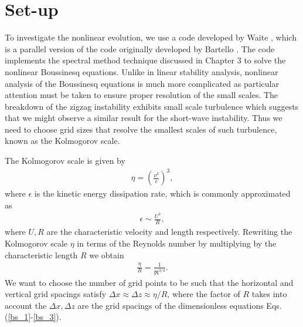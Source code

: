 \section{Set-up} 
To investigate the nonlinear evolution, we use a code developed by Waite \cite{waite2011}, which is a parallel version of the code originally developed by Bartello \cite{bartello1995}. The code implements the spectral method technique discussed in Chapter 3 to solve the nonlinear Boussinesq equations. Unlike in linear stability analysis, nonlinear analysis of the Boussinesq equations is much more complicated as particular attention must be taken to ensure proper resolution of the small scales. The breakdown of the zigzag instability exhibits small scale turbulence \cite{augier2012} which suggests that we might observe a similar result for the short-wave instability. Thus we need to choose grid sizes that resolve the smallest scales of such turbulence, known as the Kolmogorov scale. 

The Kolmogorov scale is given by \cite{lesieur}
\begin{align}
\eta = \left(\frac{\nu^{3}}{\epsilon}\right)^{3},
\end{align}
where $\epsilon$ is the kinetic energy dissipation rate, which is commonly approximated as \cite{lindborg2006}
\begin{align}
\epsilon \sim \frac{U^{3}}{R} ,
\end{align}
where $U,R$ are the characteristic velocity and length respectively. Rewriting the Kolmogorov scale $\eta$ in terms of the Reynolds number by multiplying by the characteristic length $R$ we obtain
\begin{align}
\frac{\eta}{R} = \frac{1}{\Re^{3/4}}.
\end{align}
We want to choose the number of grid points to be such that the horizontal and vertical grid spacings satisfy $\Delta x \approx \Delta z \approx \eta/R$, where the factor of $R$ takes into account the $\Delta x, \Delta z$ are the grid spacings of the dimensionless equations Eqs. (\ref{bs_1}-\ref{bs_3}).

